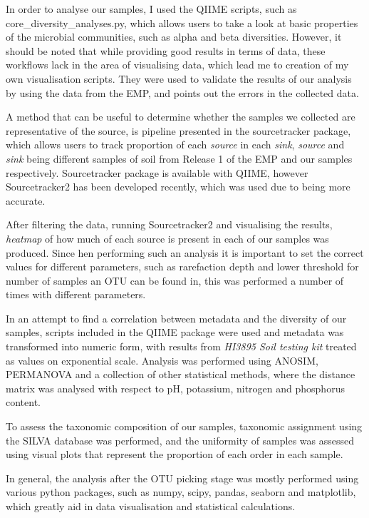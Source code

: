 \documentclass[12pt]{article}
\begin{document}
\begin{multicols}{2}
\par
In order to analyse our samples, I used the QIIME scripts, such as core\_diversity\_analyses.py, which allows users to take a look at basic properties of the microbial communities, such as alpha and beta diversities. However, it should be noted that while providing good results in terms of data, these workflows lack in the area of visualising data, which lead me to creation of my own visualisation scripts\cite{Anonymous2018}. They were used to validate the results of our analysis by using the data from the EMP, and points out the errors in the collected data.
\par
A method that can be useful to determine whether the samples we collected are representative of the source, is pipeline presented in the sourcetracker package\cite{Knights2011}, which allows users to track proportion of each \textit{source} in each \textit{sink}, \textit{source} and \textit{sink} being different samples of soil from Release 1 of the EMP and our samples respectively. Sourcetracker package is available with QIIME, however Sourcetracker2 has been developed recently, which was used due to being more accurate. 
\par
After filtering the data, running Sourcetracker2 and visualising the results, \textit{heatmap} of how much of each source is present in each of our samples was produced. Since hen performing such an analysis it is important to set the correct values for different parameters, such as rarefaction depth and lower threshold for number of samples an OTU can be found in, this was performed a number of times with different parameters.
\par
In an attempt to find a correlation between metadata and the diversity of our samples, scripts included in the QIIME package were used and metadata was transformed into numeric form, with results from \textit{HI3895 Soil testing kit} treated as values on exponential scale. Analysis was performed using ANOSIM\cite{CLARKE1993}, PERMANOVA\cite{Tang2016} and a collection of other statistical methods, where the distance matrix was analysed with respect to pH, potassium, nitrogen and phosphorus content.
\par
To assess the taxonomic composition of our samples, taxonomic assignment using the SILVA\cite{Quast2012} database was performed, and the uniformity of samples was assessed using visual plots that represent the proportion of each order in each sample. 
\par
In general, the analysis after the OTU picking stage was mostly performed using various python packages, such as numpy, scipy, pandas, seaborn and matplotlib, which greatly aid in data visualisation and statistical calculations.
%
%

\end{multicols}
\end{document}
